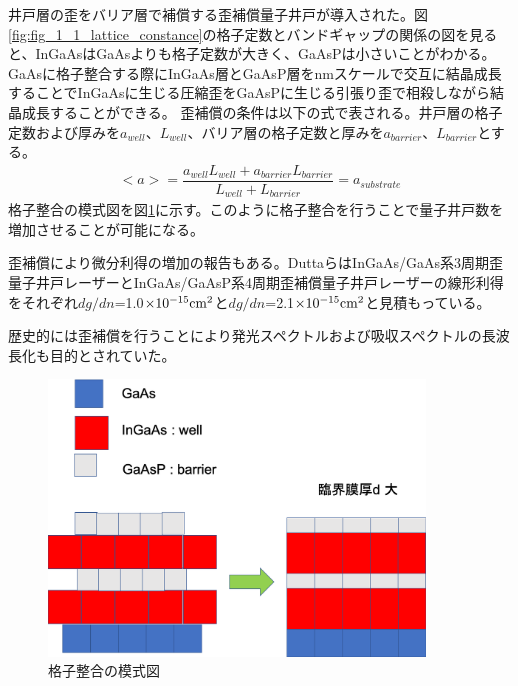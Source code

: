 井戸層の歪をバリア層で補償する歪補償量子井戸が導入された。図\ref{fig:fig_1_1_lattice_constance}の格子定数とバンドギャップの関係の図を見ると、InGaAsはGaAsよりも格子定数が大きく、GaAsPは小さいことがわかる。GaAsに格子整合する際に\rm{InGaAs}層とGaAsP層をnmスケールで交互に結晶成長することで\rm{InGaAs}に生じる圧縮歪をGaAsPに生じる引張り歪で相殺しながら結晶成長することができる。
歪補償の条件は以下の式で表される。井戸層の格子定数および厚みを$a_{well}$、$L_{well}$、バリア層の格子定数と厚みを$a_{barrier}$、$L_{barrier}$とする。
\begin{eqnarray}
<a>=\dfrac{a_{well}L_{well}+a_{barrier}L_{barrier}}{L_{well}+L_{barrier}}=a_{substrate}
\label{eq:conpensate}
\end{eqnarray}
格子整合の模式図を図\ref{fig:fig_1_1_lattice_strain_comp}に示す。このように格子整合を行うことで量子井戸数を増加させることが可能になる。


歪補償により微分利得の増加の報告もある\cite{ref_Dutta}。DuttaらはInGaAs/GaAs系3周期歪量子井戸レーザーとInGaAs/GaAsP系4周期歪補償量子井戸レーザーの線形利得をそれぞれ$dg/dn$=1.0$\times 10^{-15}\rm{ cm^{2}}$と$dg/dn$=2.1$\times 10^{-15}\rm{ cm^{2}}$と見積もっている。

歴史的には歪補償を行うことにより発光スペクトルおよび吸収スペクトルの長波長化も目的とされていた。
\begin{figure}[h]
	\centering
	\includegraphics[width=10cm]{figure/fig_1_1_lattice_strain.png}
	\caption{格子整合の模式図}
	\label{fig:fig_1_1_lattice_strain_comp}
\end{figure}

